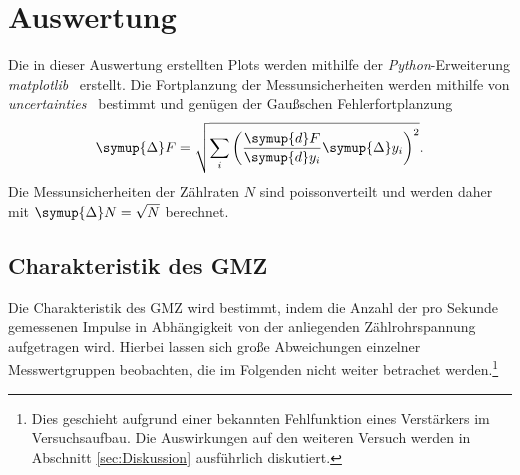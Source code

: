 \section{Auswertung}
\label{sec:Auswertung}
Die in dieser Auswertung erstellten Plots werden mithilfe der \textit{Python}-Erweiterung 
\textit{matplotlib}~\cite{matplotlib} erstellt. Die Fortplanzung der Messunsicherheiten werden mithilfe von
\textit{uncertainties}~\cite{uncertainties} bestimmt und genügen der Gaußschen Fehlerfortplanzung
\begin{equation*}
    \symup{\Delta} F = \sqrt{\sum_{i}\left(\frac{\symup{d}F}{\symup{d}y_{i}}\symup{\Delta} y_{i} \right)^2}.
\end{equation*}
Die Messunsicherheiten der Zählraten $N$ sind poissonverteilt und werden daher mit $\symup{\Delta}N = \sqrt{N}$ berechnet.

\subsection{Charakteristik des GMZ}
Die Charakteristik des GMZ wird bestimmt, indem die Anzahl der pro Sekunde gemessenen Impulse in Abhängigkeit
von der anliegenden Zählrohrspannung aufgetragen wird. Hierbei lassen sich große Abweichungen einzelner Messwertgruppen
beobachten, die im Folgenden nicht weiter betrachet werden.\footnote{Dies geschieht aufgrund einer bekannten Fehlfunktion
eines Verstärkers im Versuchsaufbau. Die Auswirkungen auf den weiteren Versuch werden in Abschnitt \ref{sec:Diskussion}
ausführlich diskutiert.}

